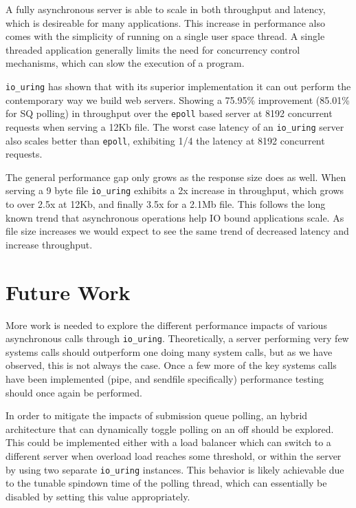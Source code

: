 \documentclass[conference]{IEEEtran}{article}
\begin{document}
A fully asynchronous server is able to scale in both throughput and latency, which is desireable for many applications. This increase in performance also comes with the simplicity of running on a single user space thread. A single threaded application generally limits the need for concurrency control mechanisms, which can slow the execution of a program.

\texttt{io\_uring} has shown that with its superior implementation it can out perform the contemporary way we build web servers. Showing a 75.95\% improvement (85.01\% for SQ polling) in throughput over the \texttt{epoll} based server at 8192 concurrent requests when serving a 12Kb file. The worst case latency of an \texttt{io\_uring} server also scales better than \texttt{epoll}, exhibiting 1/4 the latency at 8192 concurrent requests.

The general performance gap only grows as the response size does as well. When serving a 9 byte file \texttt{io\_uring} exhibits a 2x increase in throughput, which grows to over 2.5x at 12Kb, and finally 3.5x for a 2.1Mb file. This follows the long known trend that asynchronous operations help IO bound applications scale. As file size increases we would expect to see the same trend of decreased latency and increase throughput.

\section{Future Work}
\label{sec:orgc3abd8f}
More work is needed to explore the different performance impacts of various asynchronous calls through \texttt{io\_uring}. Theoretically, a server performing very few systems calls should outperform one doing many system calls, but as we have observed, this is not always the case. Once a few more of the key systems calls have been implemented (pipe, and sendfile specifically) performance testing should once again be performed.

In order to mitigate the impacts of submission queue polling, an hybrid architecture that can dynamically toggle polling on an off should be explored. This could be implemented either with a load balancer which can switch to a different server when overload load reaches some threshold, or within the server by using two separate \texttt{io\_uring} instances. This behavior is likely achievable due to the tunable spindown time of the polling thread, which can essentially be disabled by setting this value appropriately.
\end{document}
